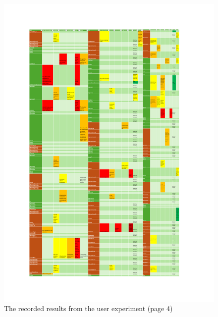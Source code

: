 \documentclass{l4proj}
\begin{document}
\begin{appendices}
\begin{figure}
    \centering
    \includegraphics[width=1\linewidth]{dissertation//images/results4.pdf}
    \caption{The recorded results from the user experiment (page 4)}
\end{figure}

\end{appendices}





\renewcommand{\thechapter}{0}


\end{document}
